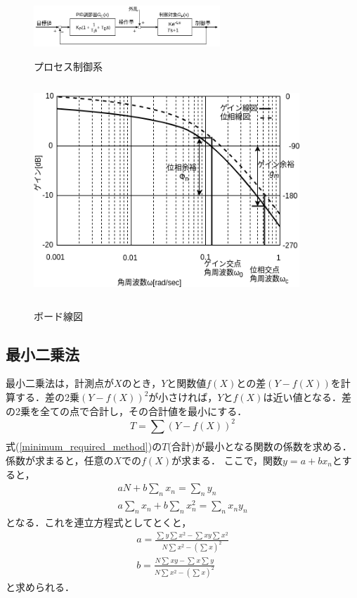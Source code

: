 \documentclass[12pt]{jsarticle}
\begin{document}
\begin{figure}[tb]
  \begin{center}
    \label{processController}
    \includegraphics[clip,width=7.0cm]{../img/2-A3.png}
    \caption{プロセス制御系}
  \end{center}
\end{figure}
\begin{figure}[tb]
  \begin{center}
    \label{Bode-Diagram}
    \includegraphics[clip, width=10.0cm, height=8.0cm]{../img/Fig2-A4.png}
    \caption{ボード線図}
  \end{center}
\end{figure}

\subsection{最小二乗法}
最小二乗法は，計測点が$X$のとき，$Y$と関数値$f(X)$との差$(Y-f(X))$を計算する．差の2乗$(Y-f(X))^2$が小さければ，$Y$と$f(X)$は近い値となる．差の2乗を全ての点で合計し，その合計値を最小にする．
\begin{equation}
  \label{minimum_required_method}
  T = \sum_{}^{}(Y-f(X))^2
\end{equation}
式(\ref{minimum_required_method})の$T$(合計)が最小となる関数の係数を求める．係数が求まると，任意の$X$での$f(X)$が求まる\cite{minimum_method}．
ここで，関数$y = a + bx_n$とすると，
\begin{eqnarray}
  \label{minimum_method}
  aN + b\sum_{n}^{}x_n = \sum_{n}^{}y_n \\
  a\sum_{n}^{}x_n + b\sum_{n}^{}x_n^2 = \sum_{n}^{}x_ny_n
\end{eqnarray}
となる．これを連立方程式としてとくと，
\begin{eqnarray}
a = \frac{\sum{}^{}y \sum{}^{}x^2 - \sum{}^{}xy\sum{}^{}x^2}{N\sum_{}^{}x^2 - (\sum_{}^{}x)^2}\\
b = \frac{N\sum{}^{}xy - \sum{}^{}x\sum{}^{}y}{N\sum_{}^{}x^2 - (\sum_{}^{}x)^2}
\end{eqnarray}
と求められる．
\end{document}
